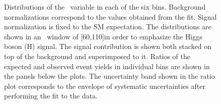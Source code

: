 \begin{figure}[!htbp]
{}
\caption{Distributions of the \mll~variable in each of the six \pth{} bins. Background normalizations correspond to the values obtained from the fit. Signal normalization is fixed to the SM expectation. The distributions are shown in an \mt{}~window of [60,110]\GeV in order to emphasize the Higgs boson (H) signal. The signal contribution is shown both stacked on top of the background and superimposed to it. Ratios of the expected and observed event yields in individual bins are shown in the panels below the plots. The uncertainty band shown in the ratio plot corresponds to the envelope of systematic uncertainties after performing the fit to the data.}\label{fig:mllSignalRegion}
\end{figure}

